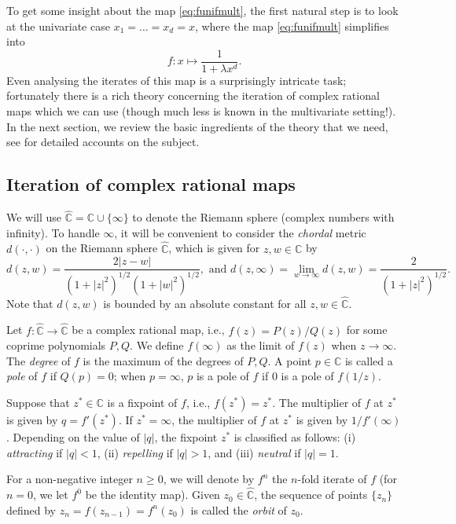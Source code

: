 \documentclass[11pt]{article}
\def\Complex{\mathbb{C}}
\def\Riem{\widehat{\Complex}}
\newcommand{\fn}[2]{#1^{#2}}
\begin{document}
To get some insight about the map \eqref{eq:funifmult}, the first natural step is to look at the univariate case $x_1=\hdots=x_d=x$, where the map \eqref{eq:funifmult} simplifies into
\[f:x\mapsto \frac{1}{1+\lambda x^d}.\]
Even analysing the iterates of this map is a surprisingly intricate task; fortunately there is a rich theory concerning the iteration of complex rational maps which we can use (though much less is known in the multivariate setting!).  In the next section, we review the basic ingredients of the theory that we need, see \cite{Beardon, Milnor} for detailed accounts on the subject. 




\subsection{Iteration of complex rational maps}\label{sec:iter}



We will use $\Riem=\Complex\cup \{\infty\}$ to denote the Riemann sphere (complex numbers with infinity). To handle $\infty$, it will be convenient to consider the \emph{chordal} metric $d(\cdot,\cdot)$ on the Riemann sphere $\Riem$, which is given for $z,w\in \Complex$ by
\[d(z,w)=\frac{2|z-w|}{(1+|z|^2)^{1/2}(1+|w|^2)^{1/2}}, \mbox{ and }
d(z,\infty)=\lim_{w\rightarrow\infty} d(z,w)=\frac{2}{(1+|z|^2)^{1/2}}.\]
Note that $d(z,w)$ is bounded by an absolute constant for all $z,w\in \Riem$.


Let $f:\Riem\rightarrow \Riem$ be a complex rational map, i.e., $f(z)=P(z)/Q(z)$ for some coprime polynomials $P,Q$. We define $f(\infty)$ as the limit of $f(z)$ when $z\rightarrow\infty$. The \emph{degree} of $f$ is the maximum of the degrees of $P,Q$.  A point $p\in \Complex$ is called a \emph{pole} of $f$ if $Q(p)=0$; when $p=\infty$, $p$ is a pole of $f$ if 0 is a pole of $f(1/z)$. 

Suppose that $z^*\in \Complex$ is a fixpoint of $f$, i.e., $f(z^*)=z^*$. The multiplier of $f$ at $z^*$ is given by $q=f'(z^*)$. If $z^*=\infty$, the multiplier of $f$ at $z^*$ is given by $1/f'(\infty)$. Depending on the value of $|q|$, the fixpoint $z^*$ is classified as follows: (i) \emph{attracting} if $|q|<1$, (ii) \emph{repelling} if $|q|>1$, and (iii) \emph{neutral} if $|q|=1$.  

For a non-negative integer $n\geq 0$, we will denote by $\fn{f}{n}$ the $n$-fold iterate of $f$ (for $n=0$, we let $\fn{f}{0}$ be the identity map). Given $z_0\in \Riem$, the sequence of points $\{z_n\}$ defined by $z_n=f(z_{n-1})=\fn{f}{n}(z_0)$ is called the \emph{orbit} of $z_0$.  
\end{document}
